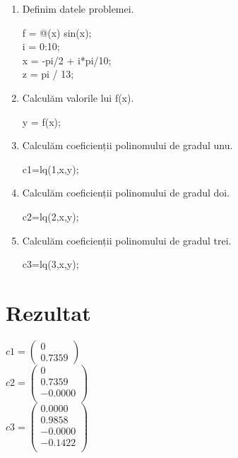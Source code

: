 \documentclass{article}
\begin{document}
\begin{center}
\begin{enumerate}
\item  Definim datele problemei. \\
\begin{center}
f = @(x) sin(x); \\
i = 0:10; \\
x = -pi/2 + i*pi/10; \\
z = pi / 13;
\end{center}
\item Calculăm valorile lui f(x). \\
 \begin{center}
    y = f(x);
 \end{center}
\item Calculăm coeficienții polinomului de gradul unu. \\
 \begin{center}
     c1=lq(1,x,y);
 \end{center}
 \item Calculăm coeficienții polinomului de gradul doi.\\
 \begin{center}
    c2=lq(2,x,y);
 \end{center}
  \item Calculăm coeficienții polinomului de gradul trei. \\
 \begin{center}
    c3=lq(3,x,y);
 \end{center}
\end{enumerate}
\end{center}

\section*{Rezultat}
\begin{center}
$
c1 =\begin{pmatrix}
   0 \\
   0.7359
\end{pmatrix}
$ 
\\
$
c2 =\begin{pmatrix}
0 \\
0.7359 \\
-0.0000 \\
\end{pmatrix}
$ 
\\
$
c3 =\begin{pmatrix}
0.0000 \\
0.9858 \\
-0.0000 \\
-0.1422 \\
\end{pmatrix}
$
\end{center}
\end{document}
